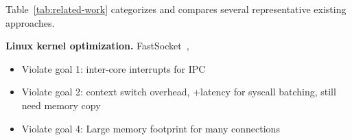 \begin{table}[t]
	\centering
{}
	\caption{Comparison of high performance socket systems.}
	\label{tab:related-work}
\end{table}

Table~\ref{tab:related-work} categorizes and compares several representative existing approaches.

\textbf{Linux kernel optimization.}
FastSocket~\cite{lin2016scalable}, 

\begin{itemize}
	\item
	Violate goal 1: inter-core interrupts for IPC 
	\item
	Violate goal 2: context switch overhead, +latency for syscall batching, still need memory copy 
	\item 
	Violate goal 4: Large memory footprint for many connections 
\end{itemize}

